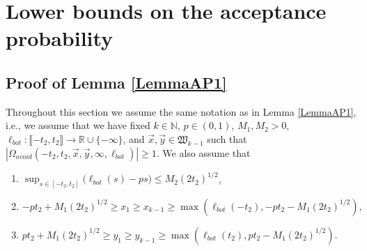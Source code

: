 %
\section{Lower bounds on the acceptance probability}\label{Section6}

\subsection{Proof of Lemma \ref{LemmaAP1}}\label{sect61} Throughout this section we assume the same notation as in Lemma \ref{LemmaAP1}, i.e., we assume that we have fixed $k \in \mathbb{N}$, $p \in (0,1)$, $M_1, M_2 > 0$, $\ell_{bot}: \llbracket -t_2, t_2 \rrbracket \rightarrow \mathbb{R} \cup \{ - \infty \}$, and $\vec{x}, \vec{y} \in \mathfrak{W}_{k-1}$ such that $|\Omega_{avoid}(-t_2, t_2, \vec{x}, \vec{y}, \infty, \ell_{bot})| \geq 1$. We also assume that
\begin{enumerate}
	\item $\sup_{s \in [- t_2,t_2]}\big(\ell_{bot}(s)  - ps \big)  \leq M_2 (2t_2)^{1/2}$,
	\item  $-pt_2 + M_1 (2t_2)^{1/2} \geq  x_1 \geq  x_{k-1} \geq \max\left(\ell_{bot}(-t_2), -pt_2- M_1 (2t_2)^{1/2}\right),$
	\item $pt_2 + M_1 (2t_2)^{1/2} \geq y_1 \geq y_{k-1} \geq  \max \left( \ell_{bot}(t_2),  p t_2- M_1(2t_2)^{1/2} \right).$
\end{enumerate}

